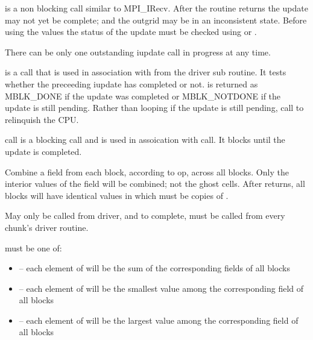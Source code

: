 \documentclass[10pt]{article}
\begin{document}
      is a non blocking call similar to MPI\_IRecv.
     After the routine returns the update may not yet be complete; and the
     outgrid may be in an inconsistent state.  Before using the values the 
     status of the
     update must be checked using  or 
     .

     There can be only one outstanding iupdate call in progress at any time.
     
\vspace{0.2in}
      is a call that is used in association with 
      from the driver sub routine.  It tests whether
      the preceeding iupdate has completed or not.
      is returned as MBLK\_DONE if the update was completed or 
      MBLK\_NOTDONE if the update is still pending.
     Rather than looping if the update is still pending, call 
     to relinquish the CPU.

\vspace{0.2in}
      call is a blocking call and is used in assoication 
     with  call. It blocks until the update is completed.

\vspace{0.2 in}
     Combine a field from each block, according to op, across all blocks.
     Only the interior values of the field will be combined; not the ghost cells.
     After  returns, all blocks will have identical
values in  which must be  copies of .


     May only be called from driver, and to complete, must be called
     from every chunk's driver routine.

      must be one of:

\begin{itemize}
        \item {}-- each element of  will be the sum 
of the corresponding fields of all blocks
        \item {}-- each element of  will be the 
smallest value among the corresponding field of all blocks
        \item {}-- each element of  will be the largest 
value among the corresponding field of all blocks
\end{itemize}
\end{document}
